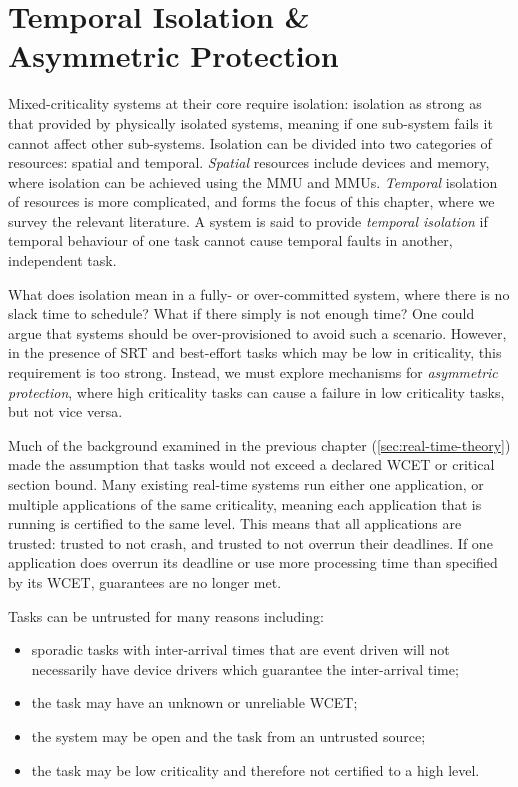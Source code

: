 \chapter{Temporal Isolation \& \\ Asymmetric Protection}
\label{chap:scheduling}

Mixed-criticality systems at their core require isolation: isolation as strong as that provided by
physically isolated systems, meaning if one sub-system fails it cannot affect other sub-systems.  Isolation
can be divided into two categories of resources: spatial and temporal. \emph{Spatial} resources include 
devices and memory, where isolation can be achieved using the \gls{MMU} and \IO\glspl{MMU}.
\emph{Temporal} isolation of resources is more complicated, and forms the focus of this chapter, where
we survey the relevant literature.
A system is said to provide \emph{temporal isolation} if temporal behaviour of one task cannot cause
temporal faults in another, independent task. 

What does isolation mean in a fully- or over-committed system, where there is no slack time 
to schedule? What if there simply is not enough time? One could argue that systems should be
over-provisioned to avoid such a scenario.
However, in the presence of \gls{SRT} and best-effort tasks which may be low in
criticality, this requirement is too strong. Instead, we must explore mechanisms for \emph{asymmetric
protection}, where high criticality tasks can cause a failure in low criticality tasks, but not vice
versa.

Much of the background examined in the previous chapter (\cref{sec:real-time-theory})
made the assumption that tasks would not exceed a declared \gls{WCET} or critical section bound. 
Many existing real-time systems run either one application, or multiple applications of the same
criticality, meaning each application that is running is certified to the same level.  This means
that all applications are trusted: trusted to not crash, and trusted to not overrun their deadlines.
If one application does overrun its deadline or use more processing time than specified by its
\gls{WCET}, guarantees are no longer met. 

Tasks can be untrusted for many reasons including:
\begin{itemize}
    \item sporadic tasks with inter-arrival times that are event driven will not necessarily
      have device drivers which guarantee the inter-arrival time;
    \item the task may have an unknown or unreliable \gls{WCET};
    \item the system may be open and the task from an untrusted source;
    \item the task may be low criticality and therefore not certified to a high level.
\end{itemize}

